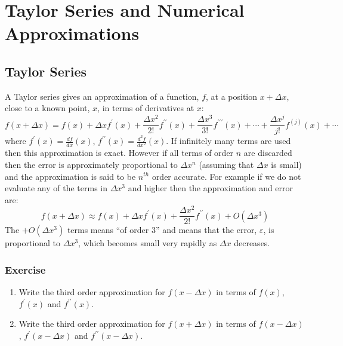 \chapter{Taylor Series and Numerical Approximations}

\section{Taylor Series}

A Taylor series gives an approximation of a function, $f$, at a position $x+\Delta x$, close to a known point, $x$, in terms of derivatives at $x$:
\begin{equation}
f(x+\Delta x) = f(x) + \Delta x f^\prime(x) + \frac{\Delta x^2}{2!} f^{\prime\prime}(x) + \frac{\Delta x^3}{3!} f^{\prime\prime\prime}(x) + \cdots
+ \frac{\Delta x^j}{j!} f^{(j)}(x) + \cdots
\label{eqn:Taylor}
\end{equation}
where $f^\prime(x) = \frac{df}{dx}(x)$, $f^{\prime\prime}(x) = \frac{d^2f}{dx^2}(x)$. If infinitely many terms are used then this approximation is exact. However if all terms of order $n$ are discarded then the error is approximately proportional to $\Delta x^n$ (assuming that $\Delta x$ is small) and the approximation is said to be $n^{th}$ order accurate. For example if we do not evaluate any of the terms in $\Delta x^3$ and higher then the approximation and error are:
\begin{equation}
f(x+\Delta x) \approx f(x) + \Delta x f^\prime(x) + \frac{\Delta x^2}{2!} f^{\prime\prime}(x) + O(\Delta x^3)
\label{eqn:Taylor3}
\end{equation}
The $+ O(\Delta x^3)$ terms means ``of order 3'' and means that the error, $\varepsilon$, is proportional to $\Delta x^3$, which becomes small very rapidly as $\Delta x$ decreases. 

\subsection{Exercise}

\begin{enumerate}
\item Write the third order approximation for $f(x-\Delta x)$ in terms of $f(x)$, $f^\prime(x)$ and $f^{\prime\prime}(x)$.

\item Write the third order approximation for $f(x+\Delta x)$ in terms of $f(x-\Delta x)$, $f^\prime(x-\Delta x)$ and $f^{\prime\prime}(x-\Delta x)$.
\end{enumerate}

